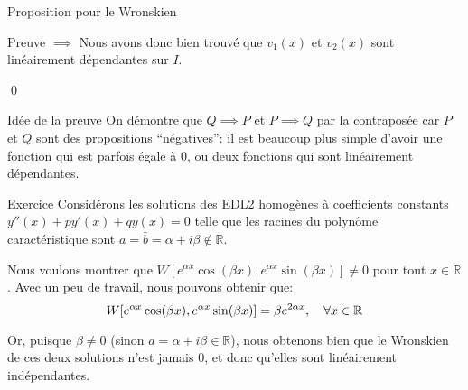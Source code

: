 \documentclass[a4paper]{article}
\begin{document}
\begin{parag}{Proposition pour le Wronskien}
\begin{subparag}{Preuve $\implies$}
    Nous avons donc bien trouvé que $v_1\left(x\right)$ et $v_2\left(x\right)$ sont linéairement dépendantes sur $I$.

    \qed
    \end{subparag}

    \begin{subparag}{Idée de la preuve}
        On démontre que $Q \implies P$ et $P \implies Q$ par la contraposée car $P$ et $Q$ sont des propositions ``négatives'': il est beaucoup plus simple d'avoir une fonction qui est parfois égale à 0, ou deux fonctions qui sont linéairement dépendantes.
    \end{subparag}
\end{parag}

\begin{parag}{Exercice}
    Considérons les solutions des EDL2 homogènes à coefficients constants $y''\left(x\right) + py'\left(x\right) + qy\left(x\right) = 0$ telle que les racines du polynôme caractéristique sont $a = \bar{b} = \alpha + i\beta \not\in\mathbb{R}$.

    Nous voulons montrer que $W\left[e^{\alpha x} \cos\left(\beta x\right), e^{\alpha x} \sin\left(\beta x\right)\right] \neq 0$ pour tout $x \in \mathbb{R}$. Avec un peu de travail, nous pouvons obtenir que:
    \[W\left[e^{\alpha x} \cos\left(\beta x\right), e^{\alpha x} \sin\left(\beta x\right)\right] = \beta e^{2\alpha x}, \mathspace \forall x \in \mathbb{R}\]

    Or, puisque $\beta \neq 0$ (sinon $a = \alpha + i\beta \in \mathbb{R}$), nous obtenons bien que le Wronskien de ces deux solutions n'est jamais 0, et donc qu'elles sont linéairement indépendantes.
\end{parag}
\end{document}
